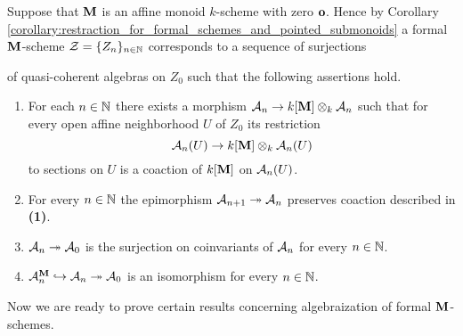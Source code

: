 \begin{remark}\label{remark:formal_equivariant_schemes}
Suppose that $\mathbf{M}$ is an affine monoid $k$-scheme with zero $\mathbf{o}$. Hence by Corollary \ref{corollary:restraction_for_formal_schemes_and_pointed_submonoids} a formal $\mathbf{M}$-scheme ${\mathcal Z} = \{Z_n\}_{n\in {\mathbb N}}$ corresponds to a sequence of surjections
\begin{center}
\end{center}
of quasi-coherent algebras on $Z_0$ such that the following assertions hold.
\begin{enumerate}[label=\textbf{(\arabic*)}, leftmargin=3.0em]
\item For each $n\in {\mathbb N}$ there exists a morphism ${\mathcal A}_n\rightarrow k[\mathbf{M}]\otimes_k{\mathcal A}_n$ such that for every open affine neighborhood $U$ of $Z_0$ its restriction 
$${\mathcal A}_n(U)\rightarrow k[\mathbf{M}]\otimes_k {\mathcal A}_n(U)$$
to sections on $U$ is a coaction of $k[\mathbf{M}]$ on ${\mathcal A}_n(U)$.
\item For every $n\in {\mathbb N}$ the epimorphism ${\mathcal A}_{n+1} \twoheadrightarrow {\mathcal A}_n$ preserves coaction described in \textbf{(1)}.
\item ${\mathcal A}_n\twoheadrightarrow {\mathcal A}_0$ is the surjection on coinvariants of ${\mathcal A}_n$ for every $n\in {\mathbb N}$.
\item ${\mathcal A}_n^{\mathbf{M}}\hookrightarrow {\mathcal A}_n\twoheadrightarrow {\mathcal A}_0$ is an isomorphism for every $n\in {\mathbb N}$.
\end{enumerate}
\end{remark}
\noindent
Now we are ready to prove certain results concerning algebraization of formal $\mathbf{M}$-schemes.

